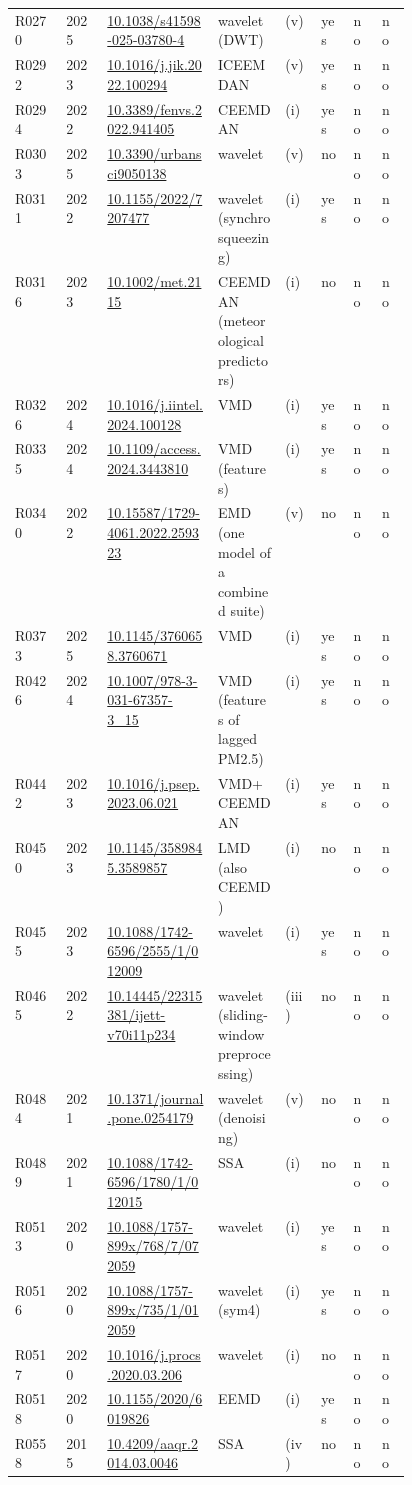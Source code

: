 \begin{longtable}{llp{0.29\linewidth}p{0.17\linewidth}llll}
R0270 & 2025 & \url{10.1038/s41598-025-03780-4} & wavelet (DWT) & (v) & yes & no & no \\
R0292 & 2023 & \url{10.1016/j.jik.2022.100294} & ICEEMDAN & (v) & yes & no & no \\
R0294 & 2022 & \url{10.3389/fenvs.2022.941405} & CEEMDAN & (i) & yes & no & no \\
R0303 & 2025 & \url{10.3390/urbansci9050138} & wavelet & (v) & no & no & no \\
R0311 & 2022 & \url{10.1155/2022/7207477} & wavelet (synchrosqueezing) & (i) & yes & no & no \\
R0316 & 2023 & \url{10.1002/met.2115} & CEEMDAN (meteorological predictors) & (i) & no & no & no \\
R0326 & 2024 & \url{10.1016/j.iintel.2024.100128} & VMD & (i) & yes & no & no \\
R0335 & 2024 & \url{10.1109/access.2024.3443810} & VMD (features) & (i) & yes & no & no \\
R0340 & 2022 & \url{10.15587/1729-4061.2022.259323} & EMD (one model of a combined suite) & (v) & no & no & no \\
R0373 & 2025 & \url{10.1145/3760658.3760671} & VMD & (i) & yes & no & no \\
R0426 & 2024 & \url{10.1007/978-3-031-67357-3_15} & VMD (features of lagged PM2.5) & (i) & yes & no & no \\
R0442 & 2023 & \url{10.1016/j.psep.2023.06.021} & VMD+CEEMDAN & (i) & yes & no & no \\
R0450 & 2023 & \url{10.1145/3589845.3589857} & LMD (also CEEMD) & (i) & no & no & no \\
R0455 & 2023 & \url{10.1088/1742-6596/2555/1/012009} & wavelet & (i) & yes & no & no \\
R0465 & 2022 & \url{10.14445/22315381/ijett-v70i11p234} & wavelet (sliding-window preprocessing) & (iii) & no & no & no \\
R0484 & 2021 & \url{10.1371/journal.pone.0254179} & wavelet (denoising) & (v) & no & no & no \\
R0489 & 2021 & \url{10.1088/1742-6596/1780/1/012015} & SSA & (i) & no & no & no \\
R0513 & 2020 & \url{10.1088/1757-899x/768/7/072059} & wavelet & (i) & yes & no & no \\
R0516 & 2020 & \url{10.1088/1757-899x/735/1/012059} & wavelet (sym4) & (i) & yes & no & no \\
R0517 & 2020 & \url{10.1016/j.procs.2020.03.206} & wavelet & (i) & no & no & no \\
R0518 & 2020 & \url{10.1155/2020/6019826} & EEMD & (i) & yes & no & no \\
R0558 & 2015 & \url{10.4209/aaqr.2014.03.0046} & SSA & (iv) & no & no & no \\
\bottomrule
\end{longtable}
